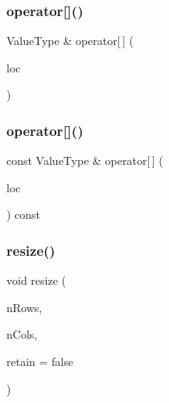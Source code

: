 \mbox{\label{classGrid_afcc1243cd81603e13b8f223f0ceabe96}} 
\subsubsection{\texorpdfstring{operator[]()}{operator[]()}\hspace{0.1cm}{\footnotesize\ttfamily [3/4]}}
{\footnotesize\ttfamily Value\+Type \& operator\mbox{[}$\,$\mbox{]} (\begin{DoxyParamCaption}\item[{const \mbox{\hyperlink{structGridLocation}{Grid\+Location}} \&}]{loc }\end{DoxyParamCaption})}

\mbox{\label{classGrid_a914315640e381831ab30403063205359}} 
\subsubsection{\texorpdfstring{operator[]()}{operator[]()}\hspace{0.1cm}{\footnotesize\ttfamily [4/4]}}
{\footnotesize\ttfamily const Value\+Type \& operator\mbox{[}$\,$\mbox{]} (\begin{DoxyParamCaption}\item[{const \mbox{\hyperlink{structGridLocation}{Grid\+Location}} \&}]{loc }\end{DoxyParamCaption}) const}

\mbox{\label{classGrid_ace38e4e9ed81ae4ec651e4db9ab09db0}} 
\subsubsection{\texorpdfstring{resize()}{resize()}}
{\footnotesize\ttfamily void resize (\begin{DoxyParamCaption}\item[{int}]{n\+Rows,  }\item[{int}]{n\+Cols,  }\item[{bool}]{retain = {\ttfamily false} }\end{DoxyParamCaption})}

